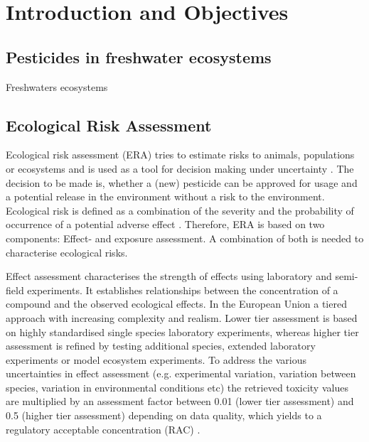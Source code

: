 
\chapter{Introduction and Objectives}
\label{sec:introduction} 

\section{Pesticides in freshwater ecosystems}

Freshwaters ecosystems 


\section{Ecological Risk Assessment}
Ecological risk assessment (ERA) tries to estimate risks to animals, populations or ecosystems and is used as a tool for decision making under uncertainty \citep{newman_fundamentals_2015}. 
The decision to be made is, whether a (new) pesticide can be approved for usage and a potential release in the environment without a risk to the environment. 
Ecological risk is defined as a combination of the severity and the probability of occurrence of a potential adverse effect \citep{suter_ecological_2007}. 
Therefore, ERA is based on two components: Effect- and exposure assessment.
A combination of both is needed to characterise ecological risks.

Effect assessment characterises the strength of effects using laboratory and semi-field experiments.
It establishes relationships between the concentration of a compound and the observed ecological effects.
In the European Union a tiered approach with increasing complexity and realism.
Lower tier assessment is based on highly standardised single species laboratory experiments, whereas higher tier assessment is refined by testing additional species, extended laboratory experiments or model ecosystem experiments. 
To address the various uncertainties in effect assessment (e.g. experimental variation, variation between species, variation in environmental conditions etc) the retrieved toxicity values are multiplied by an assessment factor between 0.01 (lower tier assessment) and 0.5 (higher tier assessment) depending on data quality, which yields to a regulatory acceptable concentration (RAC) \citep{efsa_guidance_2013}. 

